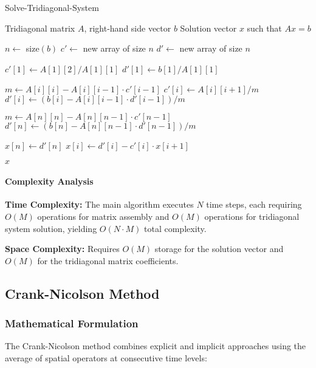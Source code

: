 \documentclass[12pt,a4paper]{article}
\numberwithin{algorithm}{subsection}
\begin{document}
\begin{algorithm}[H]
\caption{Solve-Tridiagonal-System}
\begin{algorithmic}[1]
\REQUIRE Tridiagonal matrix $A$, right-hand side vector $b$
\ENSURE Solution vector $x$ such that $Ax = b$

\STATE $n \leftarrow$ size$(b)$
\STATE $c' \leftarrow$ new array of size $n$
\STATE $d' \leftarrow$ new array of size $n$

\STATE $c'[1] \leftarrow A[1][2] / A[1][1]$
\STATE $d'[1] \leftarrow b[1] / A[1][1]$

    \STATE $m \leftarrow A[i][i] - A[i][i-1] \cdot c'[i-1]$
    \STATE $c'[i] \leftarrow A[i][i+1] / m$
    \STATE $d'[i] \leftarrow (b[i] - A[i][i-1] \cdot d'[i-1]) / m$
\ENDFOR

\STATE $m \leftarrow A[n][n] - A[n][n-1] \cdot c'[n-1]$
\STATE $d'[n] \leftarrow (b[n] - A[n][n-1] \cdot d'[n-1]) / m$

\STATE $x[n] \leftarrow d'[n]$
    \STATE $x[i] \leftarrow d'[i] - c'[i] \cdot x[i+1]$
\ENDFOR

\RETURN $x$
\end{algorithmic}
\end{algorithm}

\paragraph{Complexity Analysis}

\textbf{Time Complexity:} The main algorithm executes $N$ time steps, each requiring $O(M)$ operations for matrix assembly and $O(M)$ operations for tridiagonal system solution, yielding $O(N \cdot M)$ total complexity.

\textbf{Space Complexity:} Requires $O(M)$ storage for the solution vector and $O(M)$ for the tridiagonal matrix coefficients.

\subsection{Crank-Nicolson Method}

\subsubsection{Mathematical Formulation}

The Crank-Nicolson method combines explicit and implicit approaches using the average of spatial operators at consecutive time levels:
\end{document}
